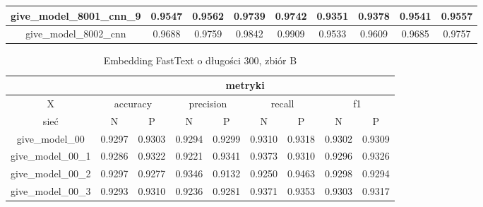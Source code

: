 \begin{table}[!h]
\begin{tabular} {|c|c|c|c|c|c|c|c|c| }
        give\_model\_8001\_cnn\_9         & 0.9547                        & 0.9562                         & 0.9739                      & 0.9742                  & 0.9351 & 0.9378 & 0.9541 & 0.9557 \\ \hline
        give\_model\_8002\_cnn            & 0.9688                        & 0.9759                         & 0.9842                      & 0.9909                  & 0.9533 & 0.9609 & 0.9685 & 0.9757 \\ \hline
    \end{tabular}
\end{table}


\begin{table}[!h] \label{tab:wyniki_fastex_B} \centering
    \caption{Embedding FastText o długości 300, zbiór B}
    \begin{tabular} {|c|c|c|c|c|c|c|c|c| }    \hline
                                          & \multicolumn{8}{c|}{metryki}                                                                                                                               \\ \hline
        X                                 & \multicolumn{2}{c|}{accuracy} & \multicolumn{2}{c|}{precision} & \multicolumn{2}{c|}{recall} & \multicolumn{2}{c|}{f1}                                     \\ \hline
        sieć                              & N                             & P                              & N                           & P                       & N      & P      & N      & P      \\ \hline
        give\_model\_00                   & 0.9297                        & 0.9303                         & 0.9294                      & 0.9299                  & 0.9310 & 0.9318 & 0.9302 & 0.9309 \\ \hline
        give\_model\_00\_1                & 0.9286                        & 0.9322                         & 0.9221                      & 0.9341                  & 0.9373 & 0.9310 & 0.9296 & 0.9326 \\ \hline
        give\_model\_00\_2                & 0.9297                        & 0.9277                         & 0.9346                      & 0.9132                  & 0.9250 & 0.9463 & 0.9298 & 0.9294 \\ \hline
        give\_model\_00\_3                & 0.9293                        & 0.9310                         & 0.9236                      & 0.9281                  & 0.9371 & 0.9353 & 0.9303 & 0.9317 \\ \hline

\end{tabular}
\end{table}
